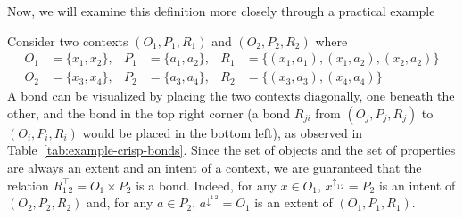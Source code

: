 \documentclass[runningheads,a4paper]{llncs}
\newcommand{\up}[1][]{{^{\uparrow_{#1}}}}
\newcommand{\down}[1][]{{^{\downarrow^{#1}}}}
\begin{document}
Now, we will examine this definition more closely through a practical example

\begin{example}\label{ex:crisp-bonds}

Consider two contexts $(O_1, P_1, R_1)$ and $(O_2, P_2, R_2)$ where
\begin{align*}
	O_1 &= \{x_1, x_2\}, & P_1 &= \{a_1, a_2\}, & R_1 &= \{(x_1, a_1), (x_1, a_2), (x_2, a_2)\} \\
	O_2 &= \{x_3, x_4\}, & P_2 &= \{a_3, a_4\}, & R_2 &= \{(x_3, a_3), (x_4, a_4)\}
\end{align*}
A bond can be visualized by placing the two contexts diagonally, one beneath the other, and the bond in the top right corner (a bond $R_{ji}$ from $(O_j, P_j, R_j)$ to $(O_i, P_i, R_i)$ would be placed in the bottom left), as observed in Table~\ref{tab:example-crisp-bonds}. 
Since the set of objects and the set of properties are always an extent and an intent of a context, we are guaranteed that the relation $R_{1\,2}^\top = O_1 \times P_2$ is a bond. Indeed, for any $x \in O_1$, $x\up[1\,2] = P_2$ is an intent of $(O_2, P_2, R_2)$ and, for any $a \in P_2$, $a\down[1\,2] = O_1$ is an extent of $(O_1, P_1, R_1)$.


\end{example}
\end{document}
